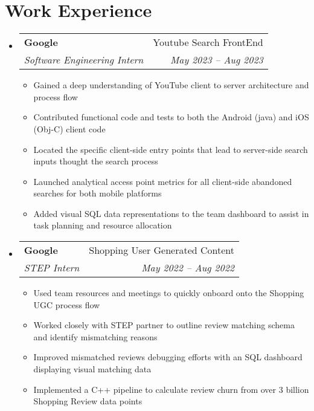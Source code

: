 \documentclass[letterpaper,11pt]{article}
\makeatletter
\newcommand{\resumeItem}[1]{
  \item\small{
    {#1 \vspace{-2pt}}
  }
}
\newcommand{\resumeSubheading}[4]{
  \vspace{-2pt}\item
    \begin{tabular*}{0.97\textwidth}[t]{l@{\extracolsep{\fill}}r}
      \textbf{#1} & #2 \\
      \textit{\small#3} & \textit{\small #4} \\
    \end{tabular*}\vspace{-7pt}
}
\newcommand{\resumeSubHeadingListStart}{\begin{itemize}[leftmargin=0.15in, label={}]}
\newcommand{\resumeSubHeadingListEnd}{\end{itemize}}
\newcommand{\resumeItemListStart}{\begin{itemize}}
\newcommand{\resumeItemListEnd}{\end{itemize}\vspace{-5pt}}
\makeatother
\begin{document}
\section{Work Experience}
    \resumeSubHeadingListStart
        \resumeSubheading
        {Google}{Youtube Search FrontEnd}
        {Software Engineering Intern}{May 2023 -- Aug 2023}
            \resumeItemListStart
                \resumeItem{Gained a deep understanding of YouTube client to server architecture and process flow}
                \resumeItem{Contributed functional code and tests to both the Android (java) and iOS (Obj-C) client code}
                \resumeItem{Located the specific client-side entry points that lead to server-side search inputs thought the search process}
                \resumeItem{Launched analytical access point metrics for all client-side abandoned searches for both mobile platforms}
                \resumeItem{Added visual SQL data representations to the team dashboard to assist in task planning and resource allocation}
            \resumeItemListEnd
        \resumeSubheading
        {Google}{Shopping User Generated Content}
        {STEP Intern}{May 2022 -- Aug 2022}
            \resumeItemListStart
                \resumeItem{Used team resources and meetings to quickly onboard onto the Shopping UGC process flow}
                \resumeItem{Worked closely with STEP partner to outline review matching schema and identify mismatching reasons}
                \resumeItem{Improved mismatched reviews debugging efforts with an SQL dashboard displaying visual matching data}
                \resumeItem{Implemented a C++ pipeline to calculate review churn from over 3 billion Shopping Review data points}
            \resumeItemListEnd
    \resumeSubHeadingListEnd

\end{document}
